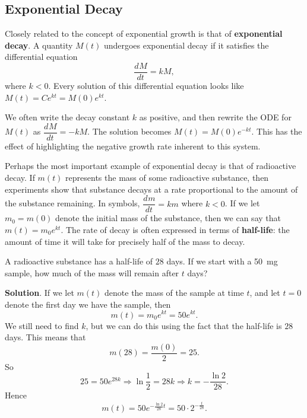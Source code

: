 \documentclass[10pt,]{book}
\newcommand{\terminology}[1]{\textbf{#1}}
\theoremstyle{ptxplainnotitle}
\theoremstyle{ptxplaintitle}
\theoremstyle{ptxplainnotitle}
\theoremstyle{ptxplaintitle}
\theoremstyle{ptxplainnotitle}
\theoremstyle{ptxplaintitle}
\theoremstyle{ptxdefinitionnotitle}
\theoremstyle{ptxdefinitiontitle}
\theoremstyle{ptxdefinitionnotitle}
\theoremstyle{ptxdefinitiontitle}
\theoremstyle{ptxdefinitionnotitle}
\theoremstyle{ptxdefinitiontitle}
\theoremstyle{ptxdefinitionnotitle}
\theoremstyle{ptxdefinitiontitle}
\theoremstyle{ptxdefinitionnotitle}
\theoremstyle{ptxdefinitiontitle}
\numberwithin{equation}{section}
\newcommand{\dv}[3][]{\dfrac{d^{#1} #2}{d #3^{#1}}}
\begin{document}
\subsection[{Exponential Decay}]{Exponential Decay}\label{subsection-exponential-decay}
\hypertarget{p-252}{}%
Closely related to the concept of exponential growth is that of \terminology{exponential decay}. A quantity \(M(t)\) undergoes exponential decay if it satisfies the differential equation%
\begin{equation*}
\dv{M}{t} = kM,
\end{equation*}
where \(k < 0\). Every solution of this differential equation looks like \(M(t) = Ce^{kt} = M(0)e^{kt}\).%
\begin{aside}{}\label{aside-7}
\hypertarget{p-253}{}%
We often write the decay constant \(k\) as positive, and then rewrite the ODE for \(M(t)\) as \(\dv{M}{t} = -kM\). The solution becomes \(M(t) = M(0)e^{-kt}\). This has the effect of highlighting the negative growth rate inherent to this system.%
\end{aside}
\hypertarget{p-254}{}%
Perhaps the most important example of exponential decay is that of radioactive decay. If \(m(t)\) represents the mass of some radioactive substance, then experiments show that substance decays at a rate proportional to the amount of the substance remaining. In symbols, \(\dv{m}{t} = km\) where \(k < 0\). If we let \(m_{0} = m(0)\) denote the initial mass of the substance, then we can say that \(m(t) = m_{0}e^{kt}\). The rate of decay is often expressed in terms of \terminology{half-life}: the amount of time it will take for precisely half of the mass to decay.%
\begin{example}\label{example-decay-from-half-life}
\hypertarget{p-255}{}%
A radioactive substance has a half-life of \(28\) days. If we start with a \SI{50}{\milli\gram} sample, how much of the mass will remain after \(t\) days?%
\par\smallskip%
\noindent\textbf{Solution}.\hypertarget{solution-55}{}\quad%
\hypertarget{p-256}{}%
If we let \(m(t)\) denote the mass of the sample at time \(t\), and let \(t=0\) denote the first day we have the sample, then%
\begin{equation*}
m(t) = m_{0}e^{kt} = 50e^{kt}.
\end{equation*}
We still need to find \(k\), but we can do this using the fact that the half-life is \(28\) days. This means that%
\begin{equation*}
m(28) = \frac{m(0)}{2} = 25.
\end{equation*}
So%
\begin{equation*}
25 = 50e^{28k}\Rightarrow \ln\frac{1}{2} = 28k\Rightarrow k = -\frac{\ln2}{28}.
\end{equation*}
Hence%
\begin{equation*}
m(t) = 50e^{-\frac{\ln2}{28}t} = 50\cdot2^{-\frac{t}{28}}.
\end{equation*}
%
\end{example}
\typeout{************************************************}
\typeout{************************************************}
\end{document}
